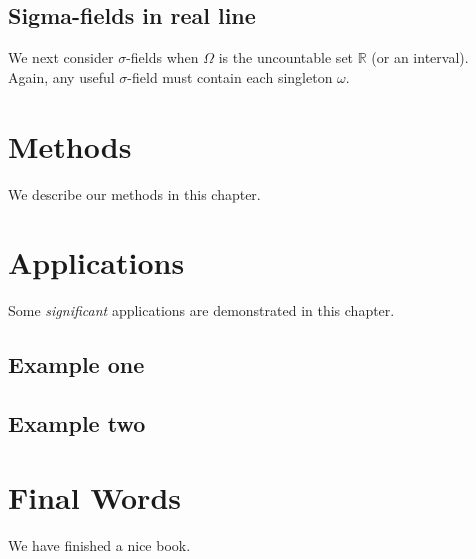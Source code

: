 \documentclass[b5paper,]{scrbook}
\theoremstyle{definition}
\theoremstyle{definition}
\theoremstyle{definition}
\theoremstyle{remark}
\begin{document}
\hypertarget{sigma-fields-in-real-line}{%
\section{Sigma-fields in real line}\label{sigma-fields-in-real-line}}

We next consider \(\sigma\)-fields when \(\Omega\) is the uncountable set \(\mathbb{R}\) (or an interval). Again, any useful \(\sigma\)-field must contain each singleton \(\omega\).

\hypertarget{methods}{%
\chapter{Methods}\label{methods}}

We describe our methods in this chapter.

\hypertarget{applications}{%
\chapter{Applications}\label{applications}}

Some \emph{significant} applications are demonstrated in this chapter.

\hypertarget{example-one}{%
\section{Example one}\label{example-one}}

\hypertarget{example-two}{%
\section{Example two}\label{example-two}}

\hypertarget{final-words}{%
\chapter{Final Words}\label{final-words}}

We have finished a nice book.


\end{document}
